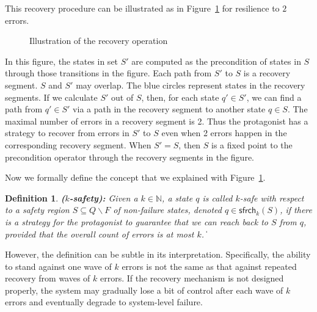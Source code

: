 \documentclass[times,10pt,twocolumn]{article}
\newtheorem{definition}{Definition}
\newcommand\safe{\mathsf{sfrch}}
\newcommand\qed{\hfill\ensuremath{\Box}}
\newcommand{\nnneg}{{\mathbb N}}
\def\qed{\ifmmode\|\else{\unskip\nobreak\hfil
\penalty50\hskip1em\null\nobreak\hfil$\blacksquare$
\parfillskip=0pt\finalhyphendemerits=0\endgraf}\fi}
\begin{document}
This recovery procedure can be illustrated as in Figure~\ref{fig.sfrch} 
for resilience to $2$ errors.  
\begin{figure}[t]
\begin{center}
\caption{Illustration of the recovery operation}
\label{fig.sfrch} 
\end{center}
\end{figure}  
In this figure, the states in set $S'$ are computed  
as the precondition of states in $S$ through those transitions in the figure.  
Each path from $S'$ to $S$ is a recovery segment. 
$S$ and $S'$ may overlap.  
The blue circles represent states in the recovery segments.  
If we calculate $S'$ out of $S$, 
then, for each state $q'\in S'$, we can find a path from 
$q'\in S'$ via a path in the recovery segment to another state $q\in S$.  
The maximal number of errors in a recovery segment is 2.  
Thus the protagonist has a strategy to recover from errors in $S'$ to $S$ 
even when 2 errors happen in the corresponding recovery segment.  
When $S'=S$, then $S$ is a fixed point to the precondition 
operator through the recovery segments in the figure.  

Now we formally define the concept that we explained with Figure~\ref{fig.sfrch}.  

\begin{definition}{\bf ($k$-safety):} 
\label{k-safe}
Given a $k\in\nnneg$, 
a state $q$ is called \mbox{$k$-safe} with respect to 
a safety region $S\subseteq Q\smallsetminus F$ of non-failure states, 
denoted $q\in\safe_k(S)$, if there 
is a strategy for the protagonist to guarantee that 
we can reach back to $S$ from $q$, provided that
the overall count of errors is at most $k$.
\qed 
\end{definition}

However, the definition can be subtle in its interpretation.  
Specifically, the ability to stand against one wave of $k$ errors 
is not the same as that against repeated recovery 
from waves of $k$ errors.  
If the recovery mechanism is not designed properly, 
the system may gradually lose a bit of control after each wave of $k$ errors 
and eventually degrade to system-level failure. 
\end{document}
